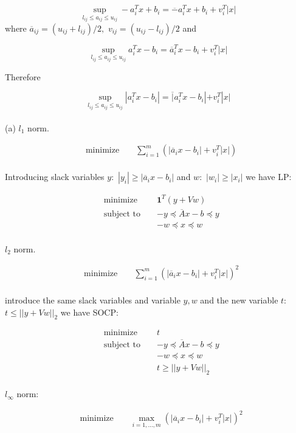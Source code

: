 \documentclass{article}
\begin{document}
$$
\sup_{l_{ij} \leq a_{ij} \leq u_{ij}} - a_i^Tx + b_i = 
\overline - a_i^T x + b_i + v_i^T |x|
$$
where 
$\overline a_{ij} = (u_{ij} + l_{ij}) / 2, $ $v_{ij} = (u_{ij} - l_{ij}) / 2$ and 

$$
\sup_{l_{ij} \leq a_{ij} \leq u_{ij}} a_i^Tx - b_i = 
\overline a_i^T x - b_i + v_i^T |x|
$$

Therefore 

$$
\sup_{l_{ij} \leq a_{ij} \leq u_{ij}} |a_i^Tx - b_i| = 
\overline |a_i^T x - b_i| + v_i^T |x|
$$
\\

(a) $l_1$ norm.

\begin{align*}
&\text{minimize } && 
\sum_{i = 1}^m (|\overline a_i x - b_i| + v_i^T |x|) \\
\end{align*}

Introducing slack variables 
$y:$ $|y_i| \geq |\overline a_i x - b_i|$
and 
$w:$ $|w_i| \geq |x_i|$
we have LP:

\begin{align*}
&\text{minimize } && 
\boldsymbol{1}^T(y + Vw)  \\
&\text{subject to } 
&& - y \preceq \overline Ax - b \preceq y\\
& && -w \preceq x \preceq w
\end{align*}
\\
$l_2$ norm.

\begin{align*}
&\text{minimize } && 
\sum_{i = 1}^m (|\overline a_i x - b_i| + v_i^T |x|)^2 \\
\end{align*}

introduce the same slack variables and variable $y, w$ and the new variable  $t:$ 
$t \leq ||y + Vw||_2$ we have SOCP:

\begin{align*}
&\text{minimize } && 
t \\
&\text{subject to } 
&& - y \preceq \overline Ax - b \preceq y\\
& && -w \preceq x \preceq w \\
& && t \geq ||y + Vw||_2
\end{align*}
\\

$l_{\infty}$ norm:

\begin{align*}
&\text{minimize } && 
\max_{i = 1, ..., m} (|\overline a_i x - b_i| + v_i^T |x|)^2 \\
\end{align*}
\end{document}
